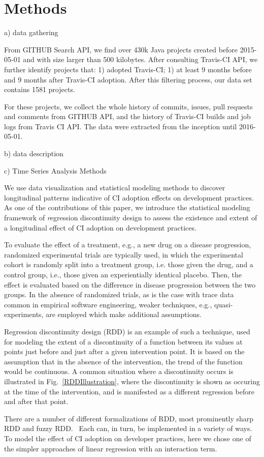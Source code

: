 \section{Methods}
\label{sec:method}

a) data gathering

From GITHUB Search API, we find over 430k Java projects created before 2015-05-01 and with size larger than 500 kilobytes. After consulting Travis-CI API, we further identify projects that: 1) adopted Travis-CI; 1) at least 9 months before and 9 months after Travis-CI adoption. After this filtering process, our data set contains 1581 projects. 

For these projects, we collect the whole history of commits, issues, pull requests and comments from GITHUB API, and the history of Travis-CI builds and job logs from Travis CI API.  The data were extracted from the inception until 2016-05-01.

b) data description

c) Time Series Analysis Methods

We use data visualization and statistical modeling methods to discover longitudinal patterns indicative of CI adoption effects on development practices.
As one of the contributions of this paper, we introduce the statistical modeling framework of {\emph regression discontinuity design} to assess the existence and extent of a longitudinal effect of CI adoption on development practices.

To evaluate the effect of a treatment, e.g., a new drug on a disease progression, randomized experimental trials are typically used, in which the experimental cohort is randomly split into a treatment group, i.e. those given the drug, and a control group, i.e., those given an experientially identical placebo. Then, the effect is evaluated based on the difference in disease progression between the two groups.
In the absence of randomized trials, as is the case with trace data common in empirical software engineering, weaker techniques, e.g., quasi-experiments, are employed which make additional assumptions.

Regression discontinuity design (RDD) is an example of such a technique, used for modeling the extent of a discontinuity of a function between its values at points just before and just after a given intervention point. 
It is based on the assumption that in the absence of the intervention, the trend of the function would be continuous.
A common situation where a discontinuity occurs is illustrated in Fig.~\ref{RDDIllustration}, where the discontinuity is shown as occuring at the time of the intervention, and is manifested as a different regression before and after that point.

There are a number of different formalizations of RDD, most prominently sharp RDD and fuzzy RDD.~\cite{}
Each can, in turn, be implemented in a variety of ways.
To model the effect of CI adoption on developer practices, here we chose one of the simpler approaches of linear regression with an interaction term.




 




